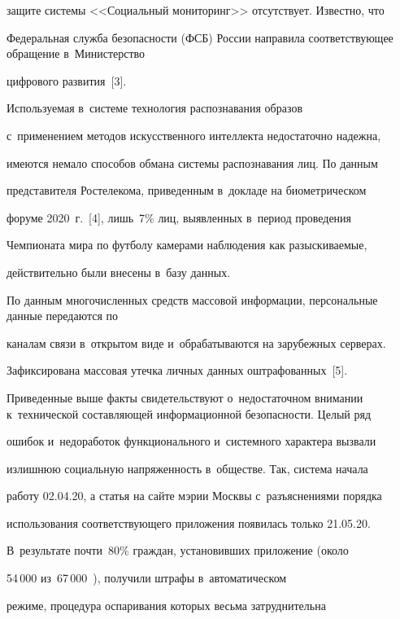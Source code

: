 защите системы <<Социальный мониторинг>> отсутствует. Известно, что 


Федеральная служба безопас\-ности (ФСБ) России направила соответствующее обращение в~Министерство 


цифрового развития~[3].


   


   Используемая в~системе технология распознавания образов 


с~применением методов искусственного интеллекта недостаточно надежна, 


имеются немало способов обмана системы распознавания лиц. По данным 


представителя Ростелекома, приведенным в~докладе на биометрическом 


форуме 2020~г.~[4], лишь~7\% лиц, выявленных в~период проведения 


Чемпионата мира по футболу камерами наблюдения как разыскиваемые, 


действительно были внесены в~базу данных. 


   


   По данным многочисленных средств массовой информации, персональные данные передаются по 


каналам связи в~открытом виде и~обрабатываются на зарубежных серверах. 


Зафиксирована массовая утечка личных данных оштрафованных~[5].


   


   Приведенные выше факты свидетельствуют о~недостаточном внимании к~технической составляющей информационной безопасности. Целый ряд 


ошибок и~недоработок функционального и~системного характера вызвали 


излишнюю социальную напряженность в~обществе. Так, система начала 


работу 02.04.20, а статья на сайте мэрии Москвы с~разъяснениями порядка 


использования соответствующего приложения появилась только 21.05.20. 


В~результате почти~80\% граждан, установивших приложение (около 


54\,000 из~67\,000~\cite{10-zts}), получили штрафы в~автоматическом 


режиме, процедура оспаривания которых весьма затруднительна 


